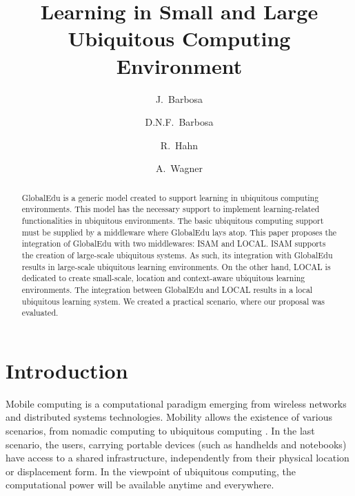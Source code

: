 \documentclass[5p,authoryear]{elsarticle}
\begin{document}
%
%
\title{Learning in Small and Large Ubiquitous Computing Environment}

\author[unisinos]{J.~Barbosa} 

\author[unilasalle]{D.N.F.~Barbosa} 

\author[unisinos]{R.~Hahn} 

\author[unisinos]{A.~Wagner} 

\address[unisinos]{PIPCA/Unisinos, S\~{a}o Leopoldo, RS, Brazil}
\address[unilasalle]{UniLasalle, Canoas, RS, Brazil} 

%
%
\begin{abstract}

GlobalEdu is a generic model created to support learning in ubiquitous
computing environments. This model has the necessary support to implement
learning-related functionalities in ubiquitous environments. The basic
ubiquitous computing support must be supplied by a middleware where GlobalEdu
lays atop. This paper proposes the integration of GlobalEdu with two
middlewares: ISAM and LOCAL. ISAM supports the creation of large-scale
ubiquitous systems. As such, its integration with GlobalEdu results in
large-scale ubiquitous learning environments. On the other hand, LOCAL is
dedicated to create small-scale, location and context-aware ubiquitous
learning environments. The integration between GlobalEdu and LOCAL results in
a local ubiquitous learning system. We created a practical scenario, where our
proposal was evaluated.

\end{abstract}

\maketitle


%
%
\section{Introduction}

Mobile computing is a computational paradigm emerging from wireless networks
and distributed systems technologies. Mobility allows the existence of various
scenarios, from nomadic computing to ubiquitous computing
\citep{weiser91,satyanarayanan01}. In the last scenario, the users, carrying
portable devices (such as handhelds and notebooks) have access to a shared
infrastructure, independently from their physical location or displacement
form. In the viewpoint of ubiquitous computing, the computational power will be
available anytime and everywhere. 
\end{document}
